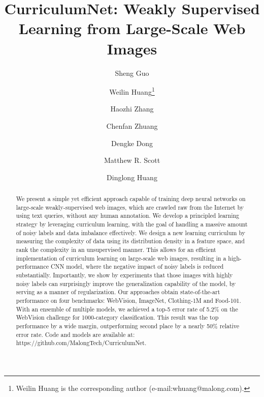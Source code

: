 \documentclass[runningheads]{llncs}
\begin{document}
\title{CurriculumNet: Weakly Supervised Learning from Large-Scale Web Images}


\author{Sheng Guo \and
Weilin Huang\thanks{Weilin Huang is the corresponding author (e-mail:whuang@malong.com).} \and
Haozhi Zhang \and Chenfan Zhuang \and Dengke Dong  \and Matthew R. Scott \and Dinglong Huang}


\maketitle              \begin{abstract}
We present a simple yet efficient approach capable of training deep neural networks on large-scale weakly-supervised web images, which are crawled raw from the Internet by using text queries, without any human annotation. We develop a principled learning strategy by leveraging curriculum learning, with the goal of handling a massive amount of noisy labels and data imbalance effectively. We design a new learning curriculum by measuring the complexity of data using its distribution density in a feature space, and rank the complexity in an unsupervised manner. This allows for an efficient implementation of curriculum learning on large-scale web images, resulting in a high-performance CNN model, where the negative impact of noisy labels is reduced substantially. Importantly, we show by experiments that those images with highly noisy labels can surprisingly improve the generalization capability of the model, by serving as a manner of regularization. Our approaches obtain state-of-the-art performance on four benchmarks: WebVision, ImageNet, Clothing-1M and Food-101. With an ensemble of multiple models, we achieved a top-5 error rate of 5.2\% on the WebVision challenge  \cite{li2017webvision} for 1000-category classification. This result was the top performance by a wide margin, outperforming second place by a nearly 50\% relative error rate. Code and models are available at: https://github.com/MalongTech/CurriculumNet. 

\end{abstract}
\end{document}
